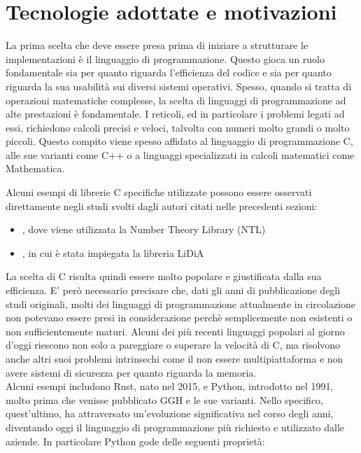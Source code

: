 \section{Tecnologie adottate e motivazioni}
\label{sec:motivations}
La prima scelta che deve essere presa prima di iniziare a strutturare
le implementazioni è il linguaggio di programmazione.
Questo gioca un ruolo fondamentale sia per quanto riguarda l'efficienza del codice e sia 
per quanto riguarda la sua usabilità sui diversi sistemi operativi. Spesso, quando si tratta 
di operazioni matematiche complesse, la scelta di linguaggi di programmazione ad alte 
prestazioni è fondamentale. I reticoli, ed in particolare i problemi legati ad essi, richiedono
calcoli precisi e veloci, talvolta con numeri molto grandi o molto piccoli.
Questo compito viene spesso affidato al linguaggio di programmazione C, alle sue varianti
come C++ o a linguaggi specializzati in calcoli matematici come Mathematica. 

Alcuni esempi di librerie C specifiche utilizzate possono essere osservati direttamente 
negli studi svolti dagli autori citati nelle precedenti sezioni:
\begin{itemize}
    \item \cite{HNF01,HNF04,Nguyen400}, dove viene utilizzata la Number Theory Library (NTL)
    \item \cite{GGH97, Nguyen99}, in cui è stata impiegata la libreria LiDiA
\end{itemize}

La scelta di C risulta quindi essere molto popolare e giustificata dalla sua efficienza. 
E' però necessario precisare che, dati gli anni di pubblicazione degli studi originali, molti
dei linguaggi di programmazione attualmente in circolazione non potevano essere presi 
in considerazione perchè semplicemente non esistenti o non sufficientemente maturi. 
Alcuni dei più recenti linguaggi
popolari al giorno d'oggi riescono non solo a pareggiare o superare la velocità di C, ma
risolvono anche altri suoi problemi intrinsechi come il non essere multipiattaforma
e non avere sistemi di sicurezza per quanto riguarda la memoria. \\
Alcuni esempi includono Rust, nato nel 2015, e Python, introdotto nel 1991, molto prima 
che venisse pubblicato GGH e le sue varianti. Nello specifico, quest'ultimo, ha attraversato 
un'evoluzione significativa nel corso degli anni, diventando oggi il linguaggio 
di programmazione più richiesto e utilizzato dalle aziende.
In particolare Python gode delle seguenti proprietà:

